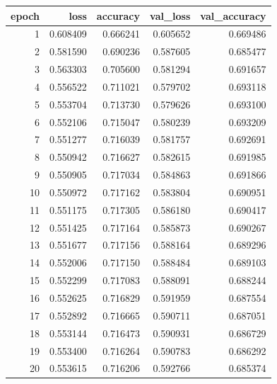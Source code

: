 \begin{tabular}{rrrrr}
\toprule
epoch & loss & accuracy & val_loss & val_accuracy \\
\midrule
1 & 0.608409 & 0.666241 & 0.605652 & 0.669486 \\
2 & 0.581590 & 0.690236 & 0.587605 & 0.685477 \\
3 & 0.563303 & 0.705600 & 0.581294 & 0.691657 \\
4 & 0.556522 & 0.711021 & 0.579702 & 0.693118 \\
5 & 0.553704 & 0.713730 & 0.579626 & 0.693100 \\
6 & 0.552106 & 0.715047 & 0.580239 & 0.693209 \\
7 & 0.551277 & 0.716039 & 0.581757 & 0.692691 \\
8 & 0.550942 & 0.716627 & 0.582615 & 0.691985 \\
9 & 0.550905 & 0.717034 & 0.584863 & 0.691866 \\
10 & 0.550972 & 0.717162 & 0.583804 & 0.690951 \\
11 & 0.551175 & 0.717305 & 0.586180 & 0.690417 \\
12 & 0.551425 & 0.717164 & 0.585873 & 0.690267 \\
13 & 0.551677 & 0.717156 & 0.588164 & 0.689296 \\
14 & 0.552006 & 0.717150 & 0.588484 & 0.689103 \\
15 & 0.552299 & 0.717083 & 0.588091 & 0.688244 \\
16 & 0.552625 & 0.716829 & 0.591959 & 0.687554 \\
17 & 0.552892 & 0.716665 & 0.590711 & 0.687051 \\
18 & 0.553144 & 0.716473 & 0.590931 & 0.686729 \\
19 & 0.553400 & 0.716264 & 0.590783 & 0.686292 \\
20 & 0.553615 & 0.716206 & 0.592766 & 0.685374 \\
\bottomrule
\end{tabular}
